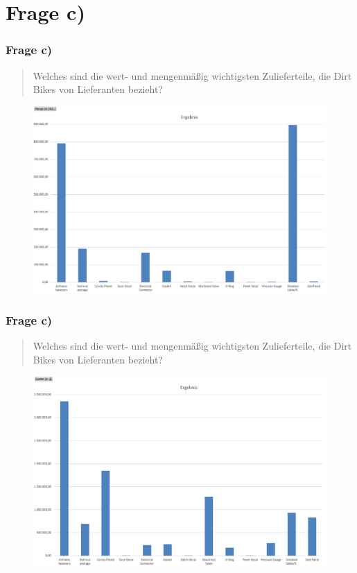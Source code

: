 \documentclass{beamer}
\begin{document}
\section{Frage c)}
\begin{frame}
\frametitle{Frage c)}

\begin{quote}
Welches sind die wert- und mengenm\"aßig wichtigsten Zulieferteile, die Dirt Bikes von Lieferanten bezieht?
\end{quote}

\begin{figure}
\includegraphics[scale=0.34]{pivot_itemNO_quantity.PNG}
\end{figure}

\end{frame}

\begin{frame}
\frametitle{Frage c)}

\begin{quote}
Welches sind die wert- und mengenm\"aßig wichtigsten Zulieferteile, die Dirt Bikes von Lieferanten bezieht?
\end{quote}

\begin{figure}
\includegraphics[scale=0.34]{pivot_itemNO_costs.PNG}
\end{figure}

\end{frame}
\end{document}
